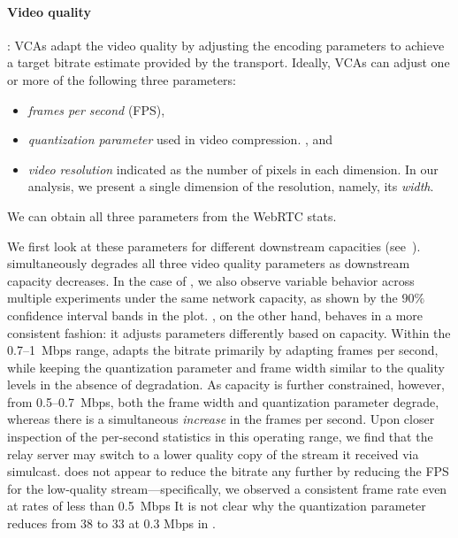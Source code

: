 \paragraph{Video quality}: VCAs adapt the video quality by adjusting the
encoding parameters to achieve a target bitrate estimate provided by the
transport. Ideally, VCAs can adjust one or more of the following three
parameters: 
\begin{itemize}
    \itemsep=-1pt
    \item \emph{frames per second} (FPS), 
    \item \textit{quantization parameter} used in video compression. , and  
    \item \textit{video resolution} indicated as the number of pixels in each dimension. In our analysis, we present a single
dimension of the resolution, namely, its \textit{width}. 
\end{itemize}
\noindent

We can obtain all three
parameters from the WebRTC stats. 

We first look at these parameters for different downstream 
capacities
(see~).
\teamsbrowser simultaneously degrades all three video quality parameters as
downstream capacity decreases. In the case of \teamsbrowser, we also observe
variable behavior across multiple experiments under the same network capacity,
as shown by the $90\%$ confidence interval bands in the plot. \meet, on the
other hand, behaves in a more consistent fashion: it adjusts parameters
differently based on capacity. Within the  0.7--1~Mbps range, \meet adapts the
bitrate primarily by adapting {frames per second}, while keeping the
{quantization parameter} and {frame width} similar to the quality levels in
the absence of degradation. As capacity is further constrained, however,
from 0.5--0.7~Mbps, both the {frame width} and {quantization parameter}
degrade, whereas there is a simultaneous {\em increase} in the frames per
second. Upon closer inspection of the per-second statistics in this operating
range, we find that the relay server may switch to a lower quality copy of the
stream it received via {simulcast}. \meet does not appear to reduce the
bitrate any further by reducing the FPS for the low-quality
stream---specifically, we observed a consistent frame rate even at rates of
less than 0.5~Mbps It is not clear why the quantization parameter reduces
from 38 to 33 at 0.3 Mbps in \meet.


